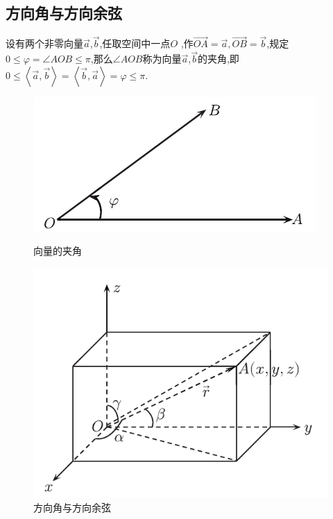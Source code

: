 \subsection{方向角与方向余弦}
\tdefination[向量的夹角]
设有两个非零向量$\overrightarrow{a}$,$\overrightarrow{b}$,任取空间中一点$O$ ,作$\overrightarrow{OA}=\overrightarrow{a},\overrightarrow{OB}=\overrightarrow{b}$,规定$0\le \varphi=\angle AOB\le \pi $,那么$\angle AOB$称为向量$\overrightarrow{a}$,$\overrightarrow{b}$的夹角,即$0\le\left\langle \overrightarrow{a},\overrightarrow{b}\right\rangle =\left\langle \overrightarrow{b},\overrightarrow{a}\right\rangle =\varphi\le \pi $.

\begin{figure}[h]
	\begin{minipage}{0.5\linewidth}
		\centering 
		\includegraphics[width=0.9\linewidth]{picture/C-1/1.1/angle.pdf}
		\caption{向量的夹角}
	\end{minipage}
	\hfill
	\begin{minipage}{0.5\linewidth}
		\centering 
		\includegraphics[width=0.9\linewidth]{picture/C-1/1.1/angle2.pdf}
		\caption{方向角与方向余弦}
	\end{minipage}
\end{figure}
